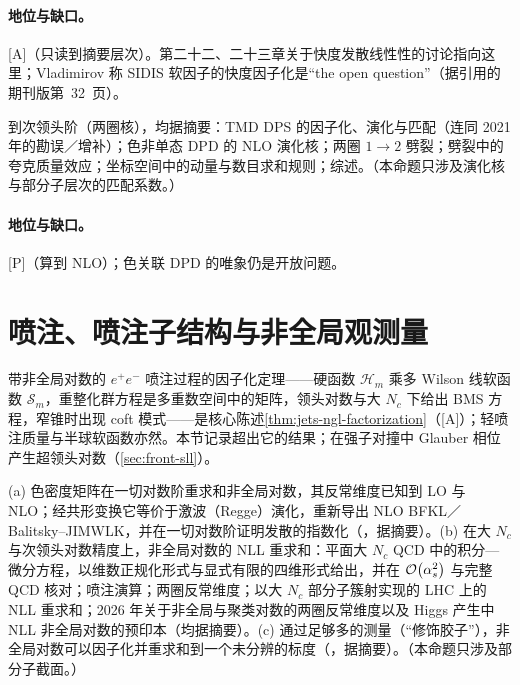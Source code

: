 \paragraph{地位与缺口。}[A]（只读到摘要层次）。第二十二、二十三章关于快度发散线性性的讨论指向这里；Vladimirov 称 SIDIS 软因子的快度因子化是“the open question”（据\cite{Liu:2023pjb}引用的\cite{Vladimirov:2017ksc}期刊版第~32~页）。

\begin{proposition}\label{prop:front-dpd-evolution}
到次领头阶（两圈核），均据摘要：TMD DPS 的因子化、演化与匹配\cite{Buffing:2017mqm}（连同 2021 年的勘误／增补）；色非单态 DPD 的 NLO 演化核\cite{Diehl:2022rxb}；两圈 $1\to2$ 劈裂\cite{Diehl:2019rdh}；劈裂中的夸克质量效应\cite{Diehl:2022dia}；坐标空间中的动量与数目求和规则\cite{Diehl:2020xyg}；综述\cite{Diehl:2017wew}。（本命题只涉及演化核与部分子层次的匹配系数。）
\end{proposition}

\paragraph{地位与缺口。}[P]（算到 NLO）；色关联 DPD 的唯象仍是开放问题。

\section{喷注、喷注子结构与非全局观测量}\label{sec:front-jets}

带非全局对数的 $e^+e^-$ 喷注过程的因子化定理\cite{Becher:2015hka,Becher:2016mmh}——硬函数 $\mathcal H_m$ 乘多 Wilson 线软函数 $\mathcal S_m$，重整化群方程是多重数空间中的矩阵，领头对数与大 $N_c$ 下给出 BMS 方程，窄锥时出现 coft 模式——是核心陈述\cref{thm:jets-ngl-factorization}（[A]）；轻喷注质量与半球软函数\cite{Becher:2016omr}亦然。本节记录超出它的结果；在强子对撞中 Glauber 相位产生超领头对数（\cref{sec:front-sll}）。

\begin{proposition}\label{prop:front-ngl}
(a) 色密度矩阵在一切对数阶重求和非全局对数，其反常维度已知到 LO 与 NLO；经共形变换它等价于激波（Regge）演化，重新导出 NLO BFKL／Balitsky--JIMWLK，并在一切对数阶证明发散的指数化（\cite{Caron-Huot:2015bja}，据摘要）。(b) 在大 $N_c$ 与次领头对数精度上，非全局对数的 NLL 重求和：平面大 $N_c$ QCD 中的积分—微分方程，以维数正规化形式与显式有限的四维形式给出，并在 $\mathcal{O}\!\left(\alpha_s^2\right)$ 与完整 QCD 核对\cite{Banfi:2021owj}；喷注演算\cite{Banfi:2021xzn}；两圈反常维度\cite{Becher:2021urs}；以大 $N_c$ 部分子簇射实现的 LHC 上的 NLL 重求和\cite{Becher:2023vrh}；2026 年关于非全局与聚类对数的两圈反常维度\cite{Becher:2026zon}以及 Higgs 产生中 NLL 非全局对数\cite{Becher:2026iim}的预印本（均据摘要）。(c) 通过足够多的测量（“修饰胶子”），非全局对数可以因子化并重求和到一个未分辨的标度（\cite{Larkoski:2015zka}，据摘要）。（本命题只涉及部分子截面。）
\end{proposition}

